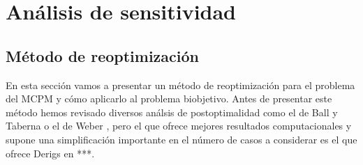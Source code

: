 \documentclass[twoside,a4paper,openright,12pt]{book}
\begin{document}
\chapter{Análisis de sensitividad}
\section{Método de reoptimización}
En esta sección vamos a presentar un método de reoptimización para el problema del MCPM y cómo aplicarlo al problema biobjetivo. Antes de presentar este método hemos revisado diversos análsis de postoptimalidad como el de Ball y Taberna \cite{balltab} o el de Weber \cite{webber}, pero el que ofrece mejores resultados computacionales y supone una simplificación importante en el número de casos a considerar es el que ofrece Derigs en \cite{derigs2}***. 
\end{document}
